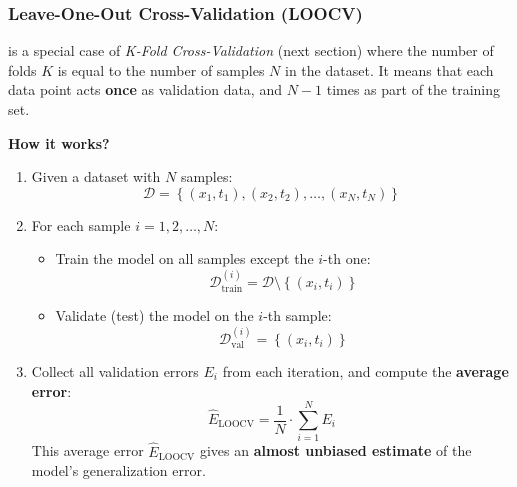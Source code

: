 \subsubsection{Leave-One-Out Cross-Validation (LOOCV)}

 is a special case of \emph{K-Fold Cross-Validation} (next section) where the number of folds $K$ is equal to the number of samples $N$ in the dataset. It means that each data point acts \textbf{once} as validation data, and $N-1$ times as part of the training set.

\highspace
\begin{flushleft}
    \textcolor{Green3}{ \textbf{How it works?}}
\end{flushleft}
\begin{enumerate}
    \item Given a dataset with $N$ samples:
    \begin{equation*}
        \mathcal{D} = \left\{
            \left(x_1, t_1\right),
            \left(x_2, t_2\right),
            \ldots,
            \left(x_N, t_N\right)
        \right\}
    \end{equation*}
    \item For each sample $i = 1, 2, \ldots, N$:
    \begin{itemize}
        \item Train the model on all samples except the $i$-th one:
        \begin{equation*}
            \mathcal{D}_{\text{train}}^{(i)} = \mathcal{D} \setminus \left\{ \left(x_i, t_i\right) \right\}
        \end{equation*}
        \item Validate (test) the model on the $i$-th sample:
        \begin{equation*}
            \mathcal{D}_{\text{val}}^{(i)} = \left\{ \left(x_i, t_i\right) \right\}
        \end{equation*}
    \end{itemize}
    \item Collect all validation errors $E_{i}$ from each iteration, and compute the \textbf{average error}:
    \begin{equation*}
        \hat{E}_{\text{LOOCV}} = \dfrac{1}{N} \cdot \sum_{i=1}^{N} E_{i}
    \end{equation*}
    This average error $\hat{E}_{\text{LOOCV}}$ gives an \textbf{almost unbiased estimate} of the model's generalization error.
\end{enumerate}

